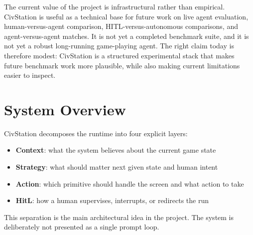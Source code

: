 \documentclass[11pt]{article}
\begin{document}
The current value of the project is infrastructural rather than empirical. CivStation is useful as a technical base for future work on live agent evaluation, human-versus-agent comparison, HITL-versus-autonomous comparisons, and agent-versus-agent matches. It is not yet a completed benchmark suite, and it is not yet a robust long-running game-playing agent. The right claim today is therefore modest: CivStation is a structured experimental stack that makes future benchmark work more plausible, while also making current limitations easier to inspect.

\section{System Overview}

CivStation decomposes the runtime into four explicit layers:
\begin{itemize}[leftmargin=*]
    \item \textbf{Context}: what the system believes about the current game state
    \item \textbf{Strategy}: what should matter next given state and human intent
    \item \textbf{Action}: which primitive should handle the screen and what action to take
    \item \textbf{HitL}: how a human supervises, interrupts, or redirects the run
\end{itemize}

This separation is the main architectural idea in the project. The system is deliberately not presented as a single prompt loop.
\end{document}
